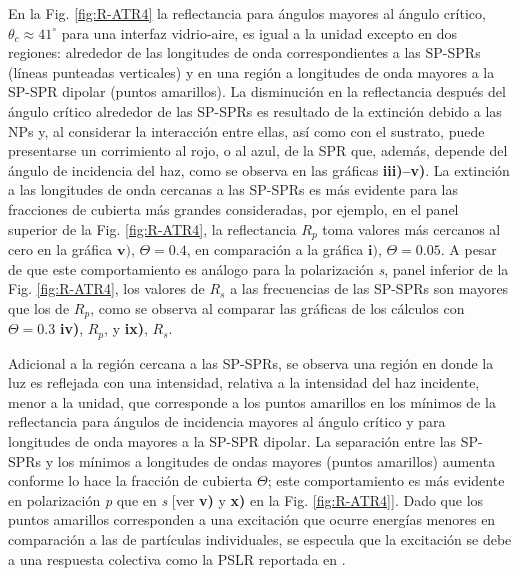 En la Fig.  \ref{fig:R-ATR4} la reflectancia para ángulos mayores al ángulo crítico, $\theta_c \approx 41^\circ $ para una interfaz vidrio-aire, es igual a la unidad excepto en dos regiones: alrededor de las longitudes de onda correspondientes a las SP-SPRs (líneas punteadas verticales) y en una región a longitudes de onda mayores a la SP-SPR dipolar (puntos amarillos). La disminución en la reflectancia después del ángulo crítico alrededor de las SP-SPRs es resultado de la extinción debido a las NPs y, al considerar la interacción entre ellas, así como con el sustrato, puede presentarse un corrimiento al rojo, o al azul, de la SPR que, además, depende del ángulo de incidencia del haz, como se observa en las gráficas \textbf{iii)--v)}. La extinción a las longitudes de onda cercanas a las SP-SPRs es más evidente para las fracciones de cubierta más grandes consideradas, por ejemplo, en el panel superior de la Fig. \ref{fig:R-ATR4}, la reflectancia $R_p$ toma valores más cercanos al cero en la gráfica $\mathbf{v)}$, $\Theta = 0.4$,  en comparación a la gráfica $\mathbf{i)}$, $\Theta = 0.05$. A pesar de que este comportamiento es análogo para la polarización \emph{s}, panel inferior de la  Fig. \ref{fig:R-ATR4}, los valores de $R_s$ a las frecuencias de las SP-SPRs son mayores que los de $R_p$, como se observa al comparar las gráficas de los cálculos con $\Theta=0.3$ \textbf{iv)}, $R_p$, y \textbf{ix)}, $R_s$.


Adicional a la región cercana a las SP-SPRs, se observa una región en donde la luz es reflejada con una intensidad, relativa a la intensidad del haz incidente, menor a la unidad, que corresponde a los puntos amarillos en los mínimos de la reflectancia para ángulos de incidencia mayores al ángulo crítico y para longitudes de onda mayores a la SP-SPR dipolar. La separación entre las SP-SPRs y los mínimos a longitudes de ondas mayores (puntos amarillos) aumenta conforme lo hace la fracción de cubierta $\Theta$; este comportamiento es más evidente en polarización \emph{p} que en \emph{s} [ver \textbf{v)} y \textbf{x)} en la Fig.  \ref{fig:R-ATR4}].  Dado que los puntos amarillos corresponden a una excitación que ocurre energías  menores en comparación a las de partículas individuales, se especula que la excitación se debe a una respuesta colectiva como la PSLR reportada en \cite{danilov2018ultra}.  
  
